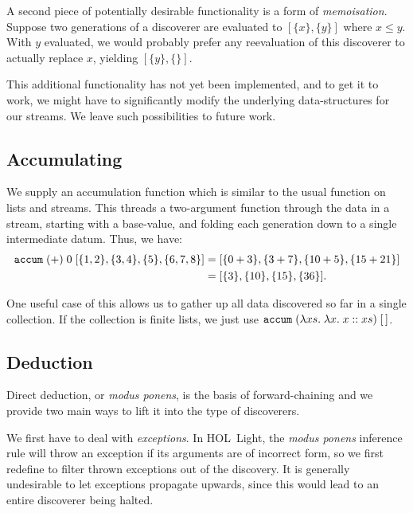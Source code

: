 A second piece of potentially desirable functionality is a form of \emph{memoisation}. Suppose two generations of a discoverer are evaluated to $[\{x\}, \{y\}]$ where $x \leq y$. With $y$ evaluated, we would probably prefer any reevaluation of this discoverer to actually replace $x$, yielding $[\{y\}, \{\}]$. 

This additional functionality has not yet been implemented, and to get it to work, we might have to significantly modify the underlying data-structures for our streams. We leave such possibilities to future work.

\subsection{Accumulating}\label{sec:Accumulating}
We supply an accumulation function which is similar to the usual  function on lists and streams. This threads a two-argument function through the data in a stream, starting with a base-value, and folding each generation down to a single intermediate datum. Thus, we have:
\begin{align*}
\texttt{accum}\;(+)\;0\;[\{1,2\}, \{3,4\}, \{5\}, \{6,7,8\}] 
&= [\{0 + 3\}, \{3 + 7\}, \{10 + 5\}, \{15 + 21\}]\\
&= [\{3\}, \{10\}, \{15\}, \{36\}].
\end{align*}

One useful case of this allows us to gather up all data discovered so far in a single collection. If the collection is finite lists, we just use $\texttt{accum}\;(\lambda xs.\;\lambda x.\;x :: xs)\;[\,]$.


\subsection{Deduction}
Direct deduction, or \emph{modus ponens}, is the basis of forward-chaining and we provide two main ways to lift it into the type of discoverers. 

We first have to deal with \emph{exceptions}. In HOL~Light, the \emph{modus ponens} inference rule will throw an exception if its arguments are of incorrect form, so we first redefine  to filter thrown exceptions out of the discovery. It is generally undesirable to let exceptions propagate upwards, since this would lead to an entire discoverer being halted. 

